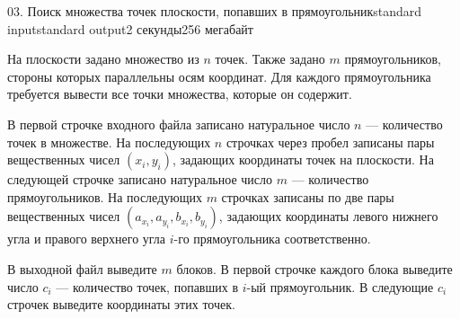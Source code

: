 \begin{problem}{03. Поиск множества точек плоскости, попавших в прямоугольник}{standard input}{standard output}{2 секунды}{256 мегабайт}

На плоскости задано множество из $n$ точек. Также задано $m$ прямоугольников, стороны которых параллельны осям координат. Для каждого прямоугольника требуется вывести все точки множества, которые он содержит.

\InputFile

В первой строчке входного файла записано натуральное число $n$ --- количество точек в множестве. На последующих $n$ строчках через пробел записаны пары вещественных чисел $(x_i, y_i)$, задающих координаты точек на плоскости.
На следующей строчке записано натуральное число $m$ --- количество прямоугольников. На последующих $m$ строчках записаны по две пары вещественных чисел $(a_{x_i}, a_{y_i}, b_{x_i}, b_{y_i})$, задающих координаты левого нижнего угла и правого верхнего угла $i$-го прямоугольника соответственно.

\OutputFile

В выходной файл выведите $m$ блоков. В первой строчке каждого блока выведите число $c_i$ --- количество точек, попавших в $i$-ый прямоугольник. В следующие $c_i$ строчек выведите координаты этих точек.

\Examples

\begin{example}%
%
\end{example}

\end{problem}
